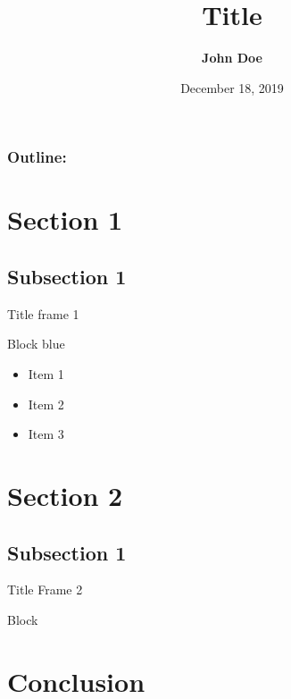 \documentclass[xcolor=dvipsnames]{beamer}
\title[Title]{\textbf{Title}}
\author[John Doe]{ \textbf{John Doe}}
\institute[UNR]{University of Nevada, Reno}
\date{December 18, 2019}
\begin{document}
{
\begin{frame}
\vspace{8em}
  \titlepage
\end{frame}
}
\begin{frame}
\frametitle{\textbf{Outline:}}
\tableofcontents
\end{frame}

		
  
    \section{Section 1}  
    \subsection{Subsection 1}
     \begin{frame}{Title frame 1}
            \begin{block}{Block blue}
    		\begin{itemize}
    		\item Item 1
    		\item Item 2
    		\item Item 3
  			\end{itemize}
        \end{block}  
     \end{frame}
          
   \section{Section 2}
   \subsection{Subsection 1}
     \begin{frame}{Title Frame 2}
        \begin{block}{Block}
            \lipsum[2]
        \end{block}
     \end{frame}
     
\section{Conclusion}
\end{document}
